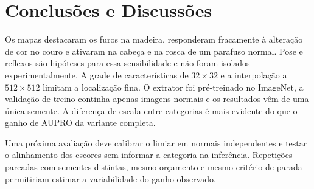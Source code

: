 \documentclass[conference]{IEEEtran}
\begin{document}
\section{Conclusões e Discussões}
Os mapas destacaram os furos na madeira, responderam fracamente à alteração de cor no couro e ativaram na cabeça e na rosca de um parafuso normal. Pose e reflexos são hipóteses para essa sensibilidade e não foram isolados experimentalmente. A grade de características de $32\times32$ e a interpolação a $512\times512$ limitam a localização fina. O extrator foi pré-treinado no ImageNet, a validação de treino continha apenas imagens normais e os resultados vêm de uma única semente. A diferença de escala entre categorias é mais evidente do que o ganho de AUPRO da variante completa.

Uma próxima avaliação deve calibrar o limiar em normais independentes e testar o alinhamento dos escores sem informar a categoria na inferência. Repetições pareadas com sementes distintas, mesmo orçamento e mesmo critério de parada permitiriam estimar a variabilidade do ganho observado.



\end{document}
